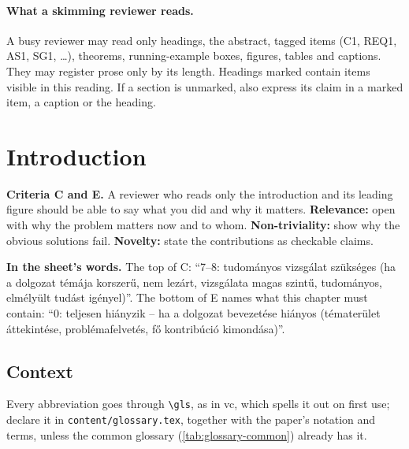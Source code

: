 \paragraph{What a skimming reviewer reads.} A busy reviewer may read only headings, the abstract, tagged items (C1, REQ1, AS1, SG1, \dots), theorems, running-example boxes, figures, tables and captions. They may register prose only by its length. Headings marked \skimmark{} contain items visible in this reading. If a section is unmarked, also express its claim in a marked item, a caption or the heading.

\section{Introduction}\label{app:chapters:intro}
\textbf{Criteria C and E.} A reviewer who reads only the introduction and its leading figure should be able to say what you did and why it matters.
\textbf{Relevance:} open with why the problem matters now and to whom.
\textbf{Non-triviality:} show why the obvious solutions fail.
\textbf{Novelty:} state the contributions as checkable claims.

\textbf{In the sheet's words.} The top of C: \enquote{7--8: tudományos vizsgálat szükséges (ha a dolgozat témája korszerű, nem lezárt, vizsgálata magas szintű, tudományos, elmélyült tudást igényel)}. The bottom of E names what this chapter must contain: \enquote{0: teljesen hiányzik -- ha a dolgozat bevezetése hiányos (tématerület áttekintése, problémafelvetés, fő kontribúció kimondása)}.

\subsection{Context}\label{app:chapters:context}
Every abbreviation goes through \texttt{\textbackslash gls}, as in \gls{vc}, which spells it out on first use; declare it in \texttt{content/glossary.tex}, together with the paper's notation and terms, unless the common glossary (\cref{tab:glossary-common}) already has it.

